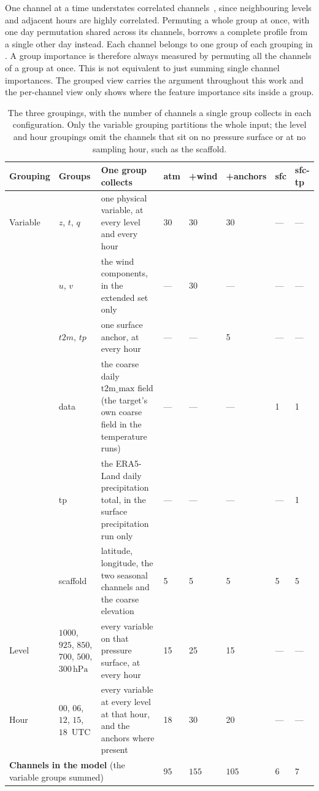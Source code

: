One channel at a time understates correlated
channels~\cite{hooker2021unrestricted}, since neighbouring levels and adjacent
hours are highly correlated. Permuting a whole group at once, with one
day permutation shared across its channels, borrows a complete profile from a single other day
instead. Each channel belongs to one group of each grouping in . A group
importance is therefore always measured by permuting all the channels of a group at once. This is not equivalent to just summing single channel importances.
The grouped view carries the argument throughout this work and the per-channel view
only shows where the feature importance sits inside a group.

\begin{table}[htbp]
\centering
\caption[The three channel groupings]{The three groupings, with the number of channels a single group collects in each configuration. Only the variable grouping partitions the whole input; the level and hour groupings omit the channels that sit on no pressure surface or at no sampling hour, such as the scaffold.}
\label{tab:meth-fi-groups}
\footnotesize
\setlength{\tabcolsep}{4pt}
\begin{tabular}{|p{1.5cm}|p{2.0cm}|p{3.3cm}|p{1.0cm}|p{1.0cm}|p{1.4cm}|p{0.9cm}|p{1.0cm}|}
\hline
\textbf{Grouping} & \textbf{Groups} & \textbf{One group collects} & \textbf{atm} & \textbf{+wind} & \textbf{+anchors} & \textbf{sfc} & \textbf{sfc-tp} \\
\hline
Variable & $z$, $t$, $q$ & one physical variable, at every level and every hour & 30 & 30 & 30 & --- & --- \\
\hline
& $u$, $v$ & the wind components, in the extended set only & --- & 30 & --- & --- & --- \\
\hline
& $t2m$, $tp$ & one surface anchor, at every hour & --- & --- & 5 & --- & --- \\
\hline
& data & the coarse daily $\mathrm{t2m\_max}$ field (the target's own coarse field in the temperature runs) & --- & --- & --- & 1 & 1 \\
\hline
& tp & the ERA5-Land daily precipitation total, in the surface precipitation run only & --- & --- & --- & --- & 1 \\
\hline
& scaffold & latitude, longitude, the two seasonal channels and the coarse elevation & 5 & 5 & 5 & 5 & 5 \\
\hline
Level & $1000$, $925$, $850$, $700$, $500$, $300\,\mathrm{hPa}$ & every variable on that pressure surface, at every hour & 15 & 25 & 15 & --- & --- \\
\hline
Hour & $00$, $06$, $12$, $15$, $18$~UTC & every variable at every level at that hour, and the anchors where present & 18 & 30 & 20 & --- & --- \\
\hline
\multicolumn{3}{|l|}{\textbf{Channels in the model} (the variable groups summed)} & $95$ & $155$ & $105$ & $6$ & $7$ \\
\hline
\end{tabular}
\end{table}


